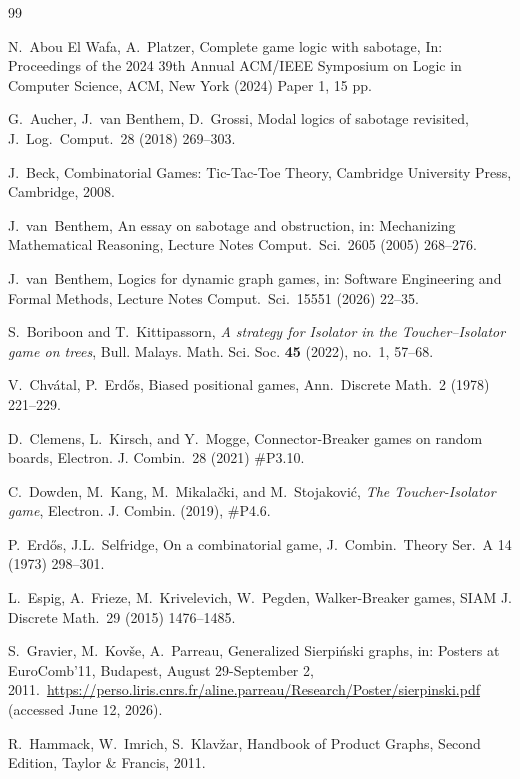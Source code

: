 \documentclass[12pt]{article}
\begin{document}
\begin{thebibliography}{99}

N.~Abou El Wafa, A.~Platzer, 
Complete game logic with sabotage,
In: Proceedings of the 2024 39th Annual ACM/IEEE Symposium on Logic in Computer Science, 
ACM, New York (2024) Paper 1, 15 pp.

G.~Aucher, J.~van Benthem, D.~Grossi, 
Modal logics of sabotage revisited,
J.\ Log.\ Comput.\ 28 (2018) 269--303.


J.~Beck,
Combinatorial Games: Tic-Tac-Toe Theory,
Cambridge University Press, Cambridge, 2008.

J.~van~Benthem, 
An essay on sabotage and obstruction,
in: Mechanizing Mathematical Reasoning,
Lecture Notes Comput.\ Sci.\ 2605 (2005) 268--276.

J.~van~Benthem, 
Logics for dynamic graph games,
in: Software Engineering and Formal Methods,
Lecture Notes Comput.\ Sci.\ 15551 (2026) 22--35.

S.~Boriboon and T.~Kittipassorn,
\textit{A strategy for Isolator in the Toucher--Isolator game on trees},
Bull. Malays. Math. Sci. Soc. \textbf{45} (2022), no.~1, 57--68.

V.~Chv\'{a}tal, P.~Erd\H{o}s, 
Biased positional games,
Ann.\ Discrete Math.\ 2 (1978) 221--229.

D.~Clemens, L.~Kirsch, and Y.~Mogge,
Connector-Breaker games on random boards,
Electron. J. Combin.\ 28 (2021) \#P3.10.

C.~Dowden, M.~Kang, M.~Mikala\v{c}ki, and M.~Stojakovi\'{c},
\textit{The Toucher-Isolator game},
Electron. J. Combin. (2019), \#P4.6.

P.~Erd\H{o}s, J.L.~Selfridge, 
On a combinatorial game,
J.\ Combin.\ Theory Ser.\ A 14 (1973) 298--301. 

L.~Espig, A.~Frieze, M.~Krivelevich, W.~Pegden,
Walker-Breaker games,
SIAM J. Discrete Math.\ 29 (2015) 1476--1485.

S.~Gravier, M.~Kov\v se, A.~Parreau,
Generalized Sierpi\'{n}ski graphs, in: Posters at EuroComb'11, Budapest, August 29-September 2, 2011.\
\url{https://perso.liris.cnrs.fr/aline.parreau/Research/Poster/sierpinski.pdf} (accessed June 12, 2026).

R.~Hammack, W.~Imrich, S.~Klav\v{z}ar, 
Handbook of Product Graphs, Second Edition, 
Taylor \& Francis, 2011. 


\end{thebibliography}
\end{document}
